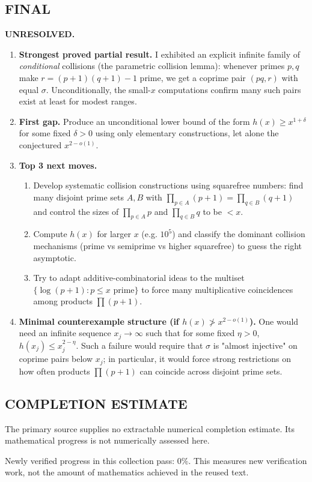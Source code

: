 \subsection*{FINAL}
\textbf{UNRESOLVED.}
\begin{enumerate}
\item[(i)] \textbf{Strongest proved partial result.} I exhibited an explicit infinite family of \emph{conditional} collisions (the parametric collision lemma): whenever primes $p,q$ make $r=(p+1)(q+1)-1$ prime, we get a coprime pair $(pq,r)$ with equal $\sigma$. Unconditionally, the small-$x$ computations confirm many such pairs exist at least for modest ranges.
\item[(ii)] \textbf{First gap.} Produce an unconditional lower bound of the form $h(x)\ge x^{1+\delta}$ for some fixed $\delta>0$ using only elementary constructions, let alone the conjectured $x^{2-o(1)}$.
\item[(iii)] \textbf{Top 3 next moves.}
  \begin{enumerate}
  \item Develop systematic collision constructions using squarefree numbers: find many disjoint prime sets $A,B$ with $\prod_{p\in A}(p+1)=\prod_{q\in B}(q+1)$ and control the sizes of $\prod_{p\in A}p$ and $\prod_{q\in B}q$ to be $<x$.
  \item Compute $h(x)$ for larger $x$ (e.g. $10^5$) and classify the dominant collision mechanisms (prime vs semiprime vs higher squarefree) to guess the right asymptotic.
  \item Try to adapt additive-combinatorial ideas to the multiset $\{\log(p+1): p\le x\text{ prime}\}$ to force many multiplicative coincidences among products $\prod(p+1)$.
  \end{enumerate}
\item[(iv)] \textbf{Minimal counterexample structure (if $h(x)\not> x^{2-o(1)}$).} One would need an infinite sequence $x_j\to\infty$ such that for some fixed $\eta>0$, $h(x_j)\le x_j^{2-\eta}$. Such a failure would require that $\sigma$ is "almost injective" on coprime pairs below $x_j$; in particular, it would force strong restrictions on how often products $\prod(p+1)$ can coincide across disjoint prime sets.
\end{enumerate}




\subsection*{COMPLETION ESTIMATE}
The primary source supplies no extractable numerical completion estimate. Its mathematical progress is not numerically assessed here.

Newly verified progress in this collection pass: $0\%$. This measures new verification work, not the amount of mathematics achieved in the reused text.
